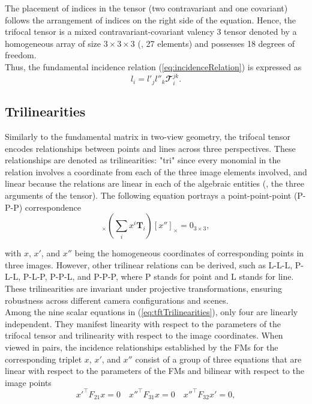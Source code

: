 The placement of indices in the tensor (two contravariant and one covariant) follows the arrangement of indices on the right side of the equation. Hence, the trifocal tensor is a mixed contravariant-covariant valency 3 tensor denoted by a homogeneous array of size \( 3 \times 3 \times 3 \) (\ie, 27 elements) and possesses 18 degrees of freedom.\\

Thus, the fundamental incidence relation (\ref{eq:incidenceRelation}) is expressed as
\begin{equation}
	l_i = l'_jl''_k\mathbfcal{T}_i^{jk}.
	\label{eq:incidenceRelationTensor}
\end{equation}

\subsection{Trilinearities}\label{sec:trilinearities}
Similarly to the fundamental matrix in two-view geometry, the trifocal tensor encodes relationships between points and lines across three perspectives. These relationships are denoted as trilinearities: "tri" since every monomial in the relation involves a coordinate from each of the three image elements involved, and linear because the relations are linear in each of the algebraic entities (\ie, the three arguments of the tensor). The following equation portrays a point-point-point (P-P-P) correspondence 
\begin{equation}
	[x']_{\times} \left( \sum_{i}x^i\bm{T}_i \right) [x'']_{\times} = 0_{3 \times 3},
	\label{eq:tftTrilinearities}
\end{equation}

with \( x \), \( x' \), and \( x'' \) being the homogeneous coordinates of corresponding points in three images. However, other trilinear relations can be derived, such as L-L-L, P-L-L, P-L-P, P-P-L, and P-P-P, where P stands for point and L stands for line. These trilinearities are invariant under projective transformations, ensuring robustness across different camera configurations and scenes.\\

Among the nine scalar equations in (\ref{eq:tftTrilinearities}), only four are linearly independent. They manifest linearity with respect to the parameters of the trifocal tensor and trilinearity with respect to the image coordinates. When viewed in pairs, the incidence relationships established by the \acs{FM}s for the corresponding triplet \( x \), \( x' \), and \( x'' \) consist of a group of three equations that are linear with respect to the parameters of the \acs{FM}s and bilinear with respect to the image points
\begin{equation}
	x'^\top F_{21}x = 0 \quad {x''}^\top F_{31}x = 0 \quad {x''}^\top F_{32}x' = 0,
\end{equation}

